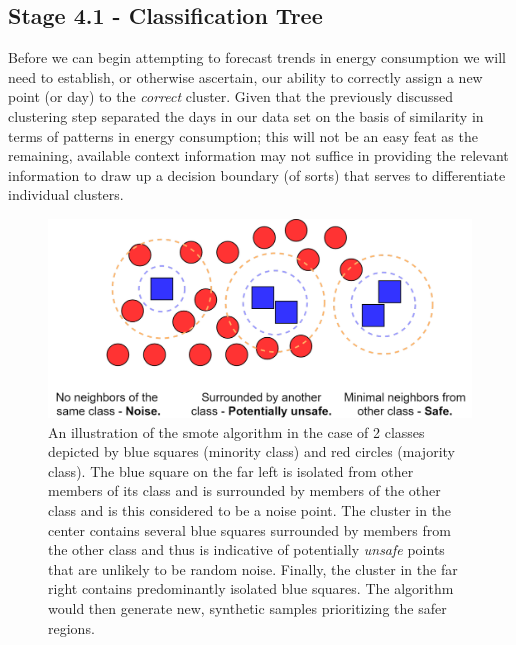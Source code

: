 \subsection{Stage 4.1 - Classification Tree}
\label{subsec:Methodology:Stage-4:Classification-Tree}
Before we can begin attempting to forecast trends in energy consumption we will need to establish, or otherwise ascertain, our ability to correctly assign a new point (or day) to the \textit{correct} cluster. Given that the previously discussed clustering step separated the days in our data set on the basis of similarity in terms of patterns in energy consumption; this will not be an easy feat as the remaining, available context information may not suffice in providing the relevant information to draw up a decision boundary (of sorts) that serves to differentiate individual clusters.

\begin{figure}[H]
    \centering
    \includegraphics[width=\textwidth]{Images/Chapter 5/Stage 4/Other/SMOTE.pdf}
    \caption{An illustration of the \gls{smote} algorithm in the case of 2 classes depicted by blue squares (minority class) and red circles (majority class). The blue square on the far left is isolated from other members of its class and is surrounded by members of the other class and is this considered to be a noise point. The cluster in the center contains several blue squares surrounded by members from the other class and thus is indicative of potentially \textit{unsafe} points that are unlikely to be random noise. Finally, the cluster in the far right contains predominantly isolated blue squares. The algorithm would then generate new, synthetic samples prioritizing the safer regions.}
    \label{fig:SMOTE}
\end{figure}

